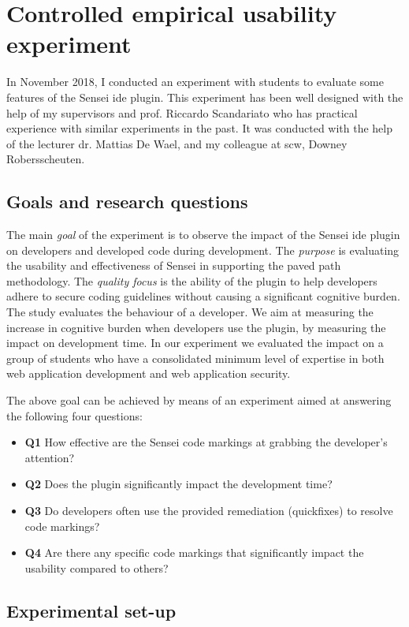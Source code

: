 \section{Controlled empirical usability experiment}
\label{sec:experiment}

In November 2018, I conducted an experiment with students to evaluate some features of the Sensei \gls{ide} plugin.
This experiment has been well designed with the help of my supervisors and prof. Riccardo Scandariato who has practical experience with similar experiments in the past.
It was conducted with the help of the lecturer dr. Mattias De Wael, and my colleague at \gls{scw}, Downey Robersscheuten.

\subsection{Goals and research questions}
The main \textit{goal} of the experiment is to observe the impact of the Sensei \gls{ide} plugin on developers and developed code during development.
The \textit{purpose} is evaluating the usability and effectiveness of Sensei in supporting the paved path methodology.
The \textit{quality focus} is the ability of the plugin to help developers adhere to secure coding guidelines without causing a significant cognitive burden.
The study evaluates the behaviour of a developer.
We aim at measuring the increase in cognitive burden when developers use the plugin, by measuring the impact on development time.
In our experiment we evaluated the impact on a group of students who have a consolidated minimum level of expertise in both web application development and web application security.

The above goal can be achieved by means of an experiment aimed at answering the following four questions:
\begin{itemize}
    \item \textbf{Q1} How effective are the Sensei code markings at grabbing the developer's attention?
    \item \textbf{Q2} Does the plugin significantly impact the development time?
    \item \textbf{Q3} Do developers often use the provided remediation (quickfixes) to resolve code markings?
    \item \textbf{Q4} Are there any specific code markings that significantly impact the usability compared to others?
\end{itemize}

\subsection{Experimental set-up}
